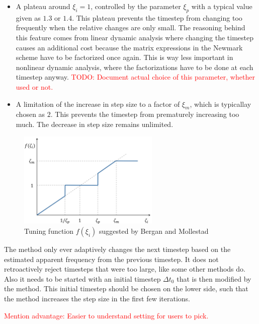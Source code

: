 \begin{itemize}
\item A plateau around $\xi_{i} = 1$, controlled by the parameter $\xi_{p}$ with a typical value given as $1.3$ or $1.4$.
This plateau prevents the timestep from changing too frequently when the relative changes are only small.
The reasoning behind this feature comes from linear dynamic analysis where changing the timestep causes an additional cost because the matrix expressions in the Newmark scheme have to be factorized once again.
This is way less important in nonlinear dynamic analysis, where the factorizations have to be done at each timestep anyway. \textcolor{red}{TODO: Document actual choice of this parameter, whether used or not.}
\item A limitation of the increase in step size to a factor of $\xi_{m}$, which is typicallay chosen as $2$.
This prevents the timestep from prematurely increasing too much.
The decrease in step size remains unlimited.
\end{itemize}

\begin{figure}[h]
\centering
\includegraphics[width=0.6\textwidth]{figures/solution/adaptive-timestep-tuning}
\caption{Tuning function $f(\xi_{i})$ suggested by Bergan and Mollestad}
\label{fig:adaptive-timestep-tuning}
\end{figure}

The method only ever adaptively changes the next timestep based on the estimated apparent frequency from the previous timestep.
It does not retroactively reject timesteps that were too large, like some other methods do.
Also it needs to be started with an initial timestep $\Delta t_{0}$ that is then modified by the method.
This initial timestep should be chosen on the lower side, such that the method increases the step size in the first few iterations.

\textcolor{red}{Mention advantage: Easier to understand setting for users to pick.}

